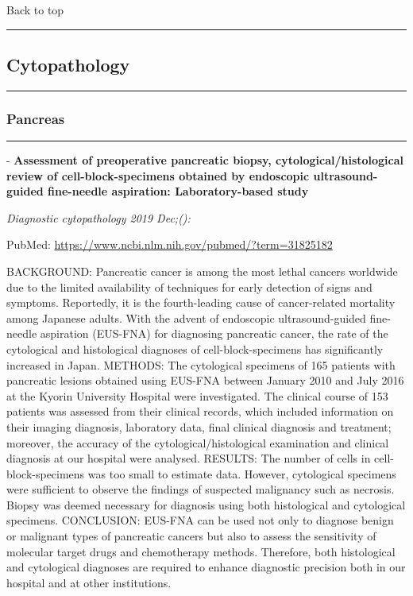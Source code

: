 \documentclass[
]{article}
\renewcommand{\linethickness}{0.05em}
\begin{document}
Back to top

\begin{center}\rule{0.5\linewidth}{\linethickness}\end{center}

\pagebreak

\hypertarget{cytopathology}{%
\subsection{Cytopathology}\label{cytopathology}}

\begin{center}\rule{0.5\linewidth}{\linethickness}\end{center}

\hypertarget{pancreas-1}{%
\subsubsection{Pancreas}\label{pancreas-1}}

\begin{center}\rule{0.5\linewidth}{\linethickness}\end{center}

- \textbf{Assessment of preoperative pancreatic biopsy,
cytological/histological review of cell-block-specimens obtained by
endoscopic ultrasound-guided fine-needle aspiration: Laboratory-based
study}

\emph{Diagnostic cytopathology 2019 Dec;():}

PubMed: \url{https://www.ncbi.nlm.nih.gov/pubmed/?term=31825182}

BACKGROUND: Pancreatic cancer is among the most lethal cancers worldwide
due to the limited availability of techniques for early detection of
signs and symptoms. Reportedly, it is the fourth-leading cause of
cancer-related mortality among Japanese adults. With the advent of
endoscopic ultrasound-guided fine-needle aspiration (EUS-FNA) for
diagnosing pancreatic cancer, the rate of the cytological and
histological diagnoses of cell-block-specimens has significantly
increased in Japan. METHODS: The cytological specimens of 165 patients
with pancreatic lesions obtained using EUS-FNA between January 2010 and
July 2016 at the Kyorin University Hospital were investigated. The
clinical course of 153 patients was assessed from their clinical
records, which included information on their imaging diagnosis,
laboratory data, final clinical diagnosis and treatment; moreover, the
accuracy of the cytological/histological examination and clinical
diagnosis at our hospital were analysed. RESULTS: The number of cells in
cell-block-specimens was too small to estimate data. However,
cytological specimens were sufficient to observe the findings of
suspected malignancy such as necrosis. Biopsy was deemed necessary for
diagnosis using both histological and cytological specimens. CONCLUSION:
EUS-FNA can be used not only to diagnose benign or malignant types of
pancreatic cancers but also to assess the sensitivity of molecular
target drugs and chemotherapy methods. Therefore, both histological and
cytological diagnoses are required to enhance diagnostic precision both
in our hospital and at other institutions.
\end{document}
